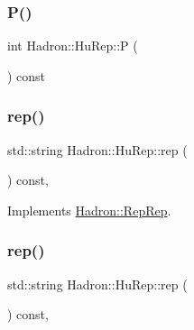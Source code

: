 \mbox{\label{structHadron_1_1HuRep_a6cae988c8d4cbcc28b9573502f672900}} 
\subsubsection{\texorpdfstring{P()}{P()}\hspace{0.1cm}{\footnotesize\ttfamily [2/2]}}
{\footnotesize\ttfamily int Hadron\+::\+Hu\+Rep\+::P (\begin{DoxyParamCaption}{ }\end{DoxyParamCaption}) const\hspace{0.3cm}{\ttfamily [inline]}}

\mbox{\label{structHadron_1_1HuRep_a4c8b93e1cd7db1a4bacd489f7bb90dbd}} 
\subsubsection{\texorpdfstring{rep()}{rep()}\hspace{0.1cm}{\footnotesize\ttfamily [1/5]}}
{\footnotesize\ttfamily std\+::string Hadron\+::\+Hu\+Rep\+::rep (\begin{DoxyParamCaption}{ }\end{DoxyParamCaption}) const\hspace{0.3cm}{\ttfamily [inline]}, {\ttfamily [virtual]}}



Implements \mbox{\hyperlink{structHadron_1_1RepRep_ab3213025f6de249f7095892109575fde}{Hadron\+::\+Rep\+Rep}}.

\mbox{\label{structHadron_1_1HuRep_a4c8b93e1cd7db1a4bacd489f7bb90dbd}} 
\subsubsection{\texorpdfstring{rep()}{rep()}\hspace{0.1cm}{\footnotesize\ttfamily [2/5]}}
{\footnotesize\ttfamily std\+::string Hadron\+::\+Hu\+Rep\+::rep (\begin{DoxyParamCaption}{ }\end{DoxyParamCaption}) const\hspace{0.3cm}{\ttfamily [inline]}, {\ttfamily [virtual]}}



